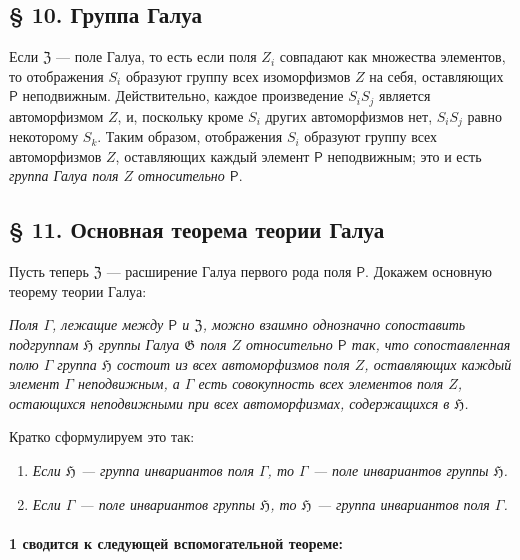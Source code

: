 \documentclass[11pt]{article}
\begin{document}
\subsection*{§ 10. Группа Галуа}\label{die-galoissche-gruppe}

Если \(\mathfrak Z\) --- поле Галуа, то есть если поля \(Z_i\) совпадают как множества элементов, то отображения \(S_i\) образуют группу всех изоморфизмов \(Z\) на себя, оставляющих \(\mathsf P\) неподвижным. Действительно, каждое произведение \(S_iS_j\) является автоморфизмом \(Z\), и, поскольку кроме \(S_i\) других автоморфизмов нет, \(S_iS_j\) равно некоторому \(S_k\). Таким образом, отображения \(S_i\) образуют группу всех автоморфизмов \(Z\), оставляющих каждый элемент \(\mathsf P\) неподвижным; это и есть \emph{группа Галуа поля \(Z\) относительно \(\mathsf P\)}.

\subsection*{§ 11. Основная теорема теории Галуа}\label{der-hauptsatz-der-galoisschen-theorie}

Пусть теперь \(\mathfrak Z\) --- расширение Галуа первого рода поля \(\mathsf P\). Докажем основную теорему теории Галуа:

\emph{Поля \(\Gamma\), лежащие между \(\mathsf P\) и \(\mathfrak Z\), можно взаимно однозначно сопоставить подгруппам \(\mathfrak H\) группы Галуа \(\mathfrak G\) поля \(Z\) относительно \(\mathsf P\) так, что сопоставленная полю \(\Gamma\) группа \(\mathfrak H\) состоит из всех автоморфизмов поля \(Z\), оставляющих каждый элемент \(\Gamma\) неподвижным, а \(\Gamma\) есть совокупность всех элементов поля \(Z\), остающихся неподвижными при всех автоморфизмах, содержащихся в \(\mathfrak H\).}

Кратко сформулируем это так:

\begin{enumerate}
\item \emph{Если \(\mathfrak H\) --- группа инвариантов поля \(\Gamma\), то \(\Gamma\) --- поле инвариантов группы \(\mathfrak H\).}
\item \emph{Если \(\Gamma\) --- поле инвариантов группы \(\mathfrak H\), то \(\mathfrak H\) --- группа инвариантов поля \(\Gamma\).}
\end{enumerate}

\paragraph{1 сводится к следующей вспомогательной теореме:}\label{laesst-sich-zurueckfuehren-auf-den-hilfssatz}
\end{document}
